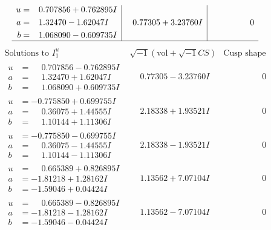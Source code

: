 \documentclass[1p]{elsarticle_modified}
\theoremstyle{definition}
\newcommand{\I}{\sqrt{-1}}
\begin{document}
$$\begin{array}{c|c|c}
\begin{aligned}
u &= \phantom{-}0.707856 + 0.762895 I \\
a &= \phantom{-}1.32470 - 1.62047 I \\
b &= \phantom{-}1.068090 - 0.609735 I\end{aligned}
 & \phantom{-}0.77305 + 3.23760 I & \phantom{-0.000000 } 0\\
 \hline 
 \end{array}$$\newpage$$\begin{array}{c|c|c}  
\text{Solutions to }I^u_{1}& \I (\text{vol} + \sqrt{-1}CS) & \text{Cusp shape}\\
 \hline 
\begin{aligned}
u &= \phantom{-}0.707856 - 0.762895 I \\
a &= \phantom{-}1.32470 + 1.62047 I \\
b &= \phantom{-}1.068090 + 0.609735 I\end{aligned}
 & \phantom{-}0.77305 - 3.23760 I & \phantom{-0.000000 } 0 \\ \hline\begin{aligned}
u &= -0.775850 + 0.699755 I \\
a &= \phantom{-}0.36075 + 1.44555 I \\
b &= \phantom{-}1.10144 + 1.11306 I\end{aligned}
 & \phantom{-}2.18338 + 1.93521 I & \phantom{-0.000000 } 0 \\ \hline\begin{aligned}
u &= -0.775850 - 0.699755 I \\
a &= \phantom{-}0.36075 - 1.44555 I \\
b &= \phantom{-}1.10144 - 1.11306 I\end{aligned}
 & \phantom{-}2.18338 - 1.93521 I & \phantom{-0.000000 } 0 \\ \hline\begin{aligned}
u &= \phantom{-}0.665389 + 0.826895 I \\
a &= -1.81218 + 1.28162 I \\
b &= -1.59046 + 0.04424 I\end{aligned}
 & \phantom{-}1.13562 + 7.07104 I & \phantom{-0.000000 } 0 \\ \hline\begin{aligned}
u &= \phantom{-}0.665389 - 0.826895 I \\
a &= -1.81218 - 1.28162 I \\
b &= -1.59046 - 0.04424 I\end{aligned}
 & \phantom{-}1.13562 - 7.07104 I & \phantom{-0.000000 } 0 \\ \hline\begin{aligned}

\end{aligned}
\end{array}$$
\end{document}
